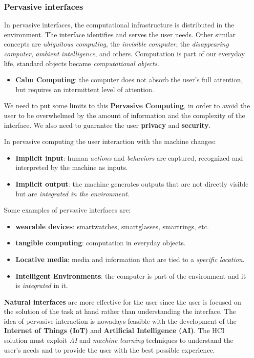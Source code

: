 \documentclass[11pt,a4paper]{article}
\theoremstyle{definition}
\theoremstyle{plain}
\theoremstyle{remark}
\begin{document}
\subsubsection{Pervasive interfaces}
In pervasive interfaces, the computational infrastructure is distributed in the environment.
The interface identifies and serves the user needs.
Other similar concepts are \textit{ubiquitous computing}, the \textit{invisible computer}, the \textit{disappearing computer}, \textit{ambient intelligence}, and others.
Computation is part of our everyday life, standard objects became \textit{computational objects}.
\begin{itemize}
    \item \textbf{Calm Computing}: the computer does not absorb the user's full attention, but requires an intermittent level of attention.
\end{itemize}
We need to put some limits to this \textbf{Pervasive Computing}, in order to avoid the user to be overwhelmed by the amount of
information and the complexity of the interface. We also need to guarantee the user \textbf{privacy} and \textbf{security}.

\begin{tcolorbox}[colback=purple!5!white,colframe=purple!75!black,title=\textbf{Implicit Interaction in Pervasive Computing}]
In pervasive computing the user interaction with the machine changes:
\begin{itemize}
    \item \textbf{Implicit input}: human \textit{actions} and \textit{behaviors} are captured, recognized and interpreted by the machine as inputs.
    \item \textbf{Implicit output}: the machine generates outputs that are not directly visible but are \textit{integrated in the environment}.
\end{itemize}
\end{tcolorbox}

Some examples of pervasive interfaces are:
\begin{itemize}
    \item \textbf{wearable devices}: smartwatches, smartglasses, smartrings, etc.
    \item \textbf{tangible computing}: computation in everyday objects.
    \item \textbf{Locative media}: media and information that are tied to a \textit{specific location}.
    \item \textbf{Intelligent Environments}: the computer is part of the environment and it is \textit{integrated} in it.
\end{itemize}
\textbf{Natural interfaces} are more effective for the user since the user is focused on the solution of the task at hand rather than understanding the interface.
The idea of pervasive interaction is nowadays feasible with the development of the \textbf{Internet of Things (IoT)} and \textbf{Artificial Intelligence (AI)}.
The HCI solution must exploit \textit{AI} and \textit{machine learning} techniques to understand the user's needs and to provide the user with the best possible experience.
\end{document}
